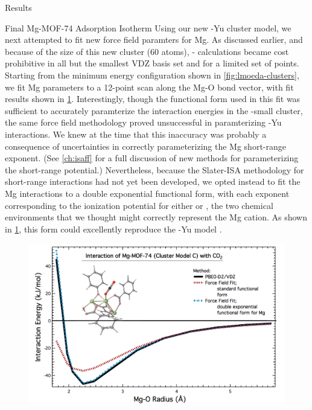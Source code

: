 \begin{section}{Results}
\begin{subsection}{Final Mg-MOF-74 {\co} Adsorption Isotherm}
Using our new \mgmof-Yu cluster model, we next attempted to fit new
force field paramters for Mg. As discussed earlier, and
because of the size of this new cluster (60 atoms), \lmoeda-\pbeod
calculations became cost prohibitive in all but the smallest VDZ basis set and
for a limited set of points. Starting from the minimum energy configuration
shown in \cref{fig:lmoeda-clusters}, we fit Mg parameters to a 12-point scan along the
Mg-O bond vector, with fit results shown in  
\cref{fig:lmoeda-xlarge_fit}. Interestingly, though the functional form used
in this fit was sufficient to accurately paramterize the interaction energies
in the \mgmof-small cluster, the same force field methodology proved
unsuccessful in paramterizing \mgmof-Yu interactions. We knew at the time that
this inaccuracy was probably a consequence of uncertainties in correctly
parameterizing the Mg short-range exponent. (See \cref{ch:isaff} for a full
discussion of new methods for parameterizing the short-range potential.) Nevertheless, because the Slater-ISA methodology
for short-range interactions had not yet been developed, we opted instead to
fit the Mg interactions to a double exponential functional form, with each
exponent corresponding to the ionization potential for either  or
, the two chemical environments that we thought might correctly
represent the Mg cation. As shown in \cref{fig:lmoeda-xlarge_fit}, this
form could excellently reproduce the \mgmof-Yu model \pes.


    \begin{figure}
    \centering
    \includegraphics[width=1.0\textwidth]{lmoeda/xlarge_ff_fit.pdf}
    \caption[Model clusters for \mgmof]
{
            }
    \label{fig:lmoeda-xlarge_fit}
    \end{figure}



\end{subsection}
\end{section}
